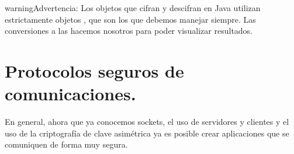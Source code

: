 \documentclass[letterpaper,10pt,spanish]{sphinxmanual}
\begin{document}
\begin{sphinxVerbatim}[commandchars=\\\{\}]

                 
                \PYG{o}{[}\PYG{o}{]} 
                 
                                  
\end{sphinxVerbatim}

\begin{sphinxadmonition}{warning}{Advertencia:}
Los objetos que cifran y descifran en Java utilizan estrictamente objetos , que
son los que debemos manejar siempre. Las conversiones a  las hacemos nosotros para poder visualizar resultados.
\end{sphinxadmonition}


\section{Protocolos seguros de comunicaciones.}
\label{\detokenize{textos/tema5:protocolos-seguros-de-comunicaciones}}
En general, ahora que ya conocemos sockets, el uso de servidores y clientes y el uso de la criptografía de clave asimétrica ya es posible crear aplicaciones que se comuniquen de forma muy segura.
\end{document}
